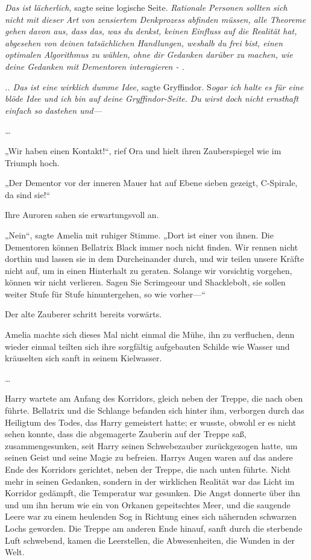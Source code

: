 {\emph{Das ist lächerlich,} sagte seine logische Seite. \emph{Rationale Personen sollten sich nicht mit dieser Art von zensiertem Denkprozess abfinden müssen, alle Theoreme gehen davon aus, dass das, was du denkst, keinen Einfluss auf die Realität hat, abgesehen von deinen tatsächlichen Handlungen, weshalb du frei bist, einen optimalen Algorithmus zu wählen, ohne dir Gedanken darüber zu machen, wie deine Gedanken mit Dementoren interagieren - .}

\emph{.. Das ist eine wirklich dumme Idee,} sagte Gryffindor. S\emph{ogar ich halte es für eine} \emph{blöde Idee und ich bin auf deine Gryffindor-Seite.} \emph{Du wirst doch nicht ernsthaft einfach so dastehen und—}

\emph{…}

„Wir haben einen Kontakt!“, rief Ora und hielt ihren Zauberspiegel wie im Triumph hoch.

„Der Dementor vor der inneren Mauer hat auf Ebene sieben gezeigt, C-Spirale, da sind sie!“

Ihre Auroren sahen sie erwartungsvoll an.

„Nein“, sagte Amelia mit ruhiger Stimme. „Dort ist einer von ihnen. Die Dementoren können Bellatrix Black immer noch nicht finden. Wir rennen nicht dorthin und lassen sie in dem Durcheinander durch, und wir teilen unsere Kräfte nicht auf, um in einen Hinterhalt zu geraten. Solange wir vorsichtig vorgehen, können wir nicht verlieren. Sagen Sie Scrimgeour und Shacklebolt, sie sollen weiter Stufe für Stufe hinuntergehen, so wie vorher—“

Der alte Zauberer schritt bereits vorwärts.

Amelia machte sich dieses Mal nicht einmal die Mühe, ihn zu verfluchen, denn wieder einmal teilten sich ihre sorgfältig aufgebauten Schilde wie Wasser und kräuselten sich sanft in seinem Kielwasser.

…

Harry wartete am Anfang des Korridors, gleich neben der Treppe, die nach oben führte. Bellatrix und die Schlange befanden sich hinter ihm, verborgen durch das Heiligtum des Todes, das Harry gemeistert hatte; er wusste, obwohl er es nicht sehen konnte, dass die abgemagerte Zauberin auf der Treppe saß, zusammengesunken, seit Harry seinen Schwebezauber zurückgezogen hatte, um seinen Geist und seine Magie zu befreien. Harrys Augen waren auf das andere Ende des Korridors gerichtet, neben der Treppe, die nach unten führte. Nicht mehr in seinen Gedanken, sondern in der wirklichen Realität war das Licht im Korridor gedämpft, die Temperatur war gesunken. Die Angst donnerte über ihn und um ihn herum wie ein von Orkanen gepeitschtes Meer, und die saugende Leere war zu einem heulenden Sog in Richtung eines sich nähernden schwarzen Lochs geworden. Die Treppe am anderen Ende hinauf, sanft durch die sterbende Luft schwebend, kamen die Leerstellen, die Abwesenheiten, die Wunden in der Welt.

}
